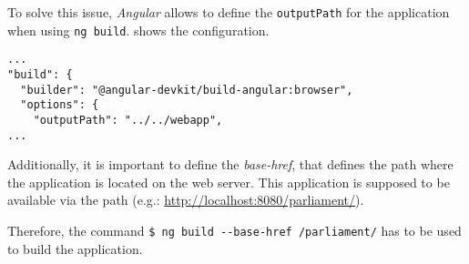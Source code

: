 To solve this issue, \textit{Angular} allows to define the \texttt{outputPath} for the application when using \texttt{ng build}.  shows the  configuration.
\begin{lstlisting}[label=lst:04_comments_building_config, caption=\texttt{angular.json} configuration]
...
"build": {
  "builder": "@angular-devkit/build-angular:browser",
  "options": {
    "outputPath": "../../webapp",
...
\end{lstlisting}


Additionally, it is important to define the \textit{base-href}, that defines the path where the application is located on the web server. This application is supposed to be available via the path  (e.g.: \url{http://localhost:8080/parliament/}).


Therefore, the command \texttt{\$ ng build -{}-base-href /parliament/} has to be used to build the application.
